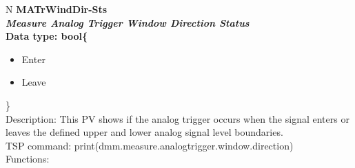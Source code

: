 \documentclass[openany]{article}
\begin{document}
		\begin{tabular}{N}
			\hline
			\bfseries MATrWindDir-Sts\label{pv:matrwinddir-sts} \\ \hline
			\emph{Measure Analog Trigger Window Direction Status} \\
			Data type: bool\{\begin{itemize}[noitemsep]
				\small
				\item[] Enter
				\item[] Leave
			\end{itemize}\} \\
			Description: This PV shows if the analog trigger occurs when the signal enters or leaves the defined upper and lower analog signal level boundaries. \\
			TSP command: print(dmm.measure.analogtrigger.window.direction) \\
			Functions: \\
			\arrayrulecolor{\FuncTableBorderColor}

		\end{tabular}
\end{document}
